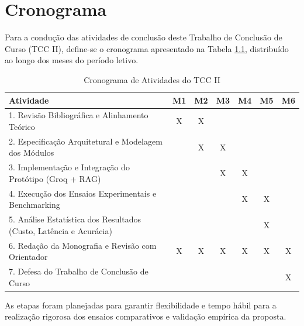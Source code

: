 \chapter{Cronograma}\label{cronograma}

Para a condução das atividades de conclusão deste Trabalho de Conclusão de Curso (TCC II), define-se o cronograma apresentado na Tabela \ref{tab:cronograma_tcc2}, distribuído ao longo dos meses do período letivo.

\begin{table}[!htb]
\centering
\caption{Cronograma de Atividades do TCC II}
\label{tab:cronograma_tcc2}
\begin{tabular}{|p{7.5cm}|c|c|c|c|c|c|}
\hline
\textbf{Atividade} & \textbf{M1} & \textbf{M2} & \textbf{M3} & \textbf{M4} & \textbf{M5} & \textbf{M6} \\ \hline
1. Revisão Bibliográfica e Alinhamento Teórico & X & X &  &  &  &  \\ \hline
2. Especificação Arquitetural e Modelagem dos Módulos &  & X & X &  &  &  \\ \hline
3. Implementação e Integração do Protótipo (Groq + RAG) &  &  & X & X &  &  \\ \hline
4. Execução dos Ensaios Experimentais e Benchmarking &  &  &  & X & X &  \\ \hline
5. Análise Estatística dos Resultados (Custo, Latência e Acurácia) &  &  &  &  & X &  \\ \hline
6. Redação da Monografia e Revisão com Orientador & X & X & X & X & X & X \\ \hline
7. Defesa do Trabalho de Conclusão de Curso &  &  &  &  &  & X \\ \hline
\end{tabular}
\end{table}

As etapas foram planejadas para garantir flexibilidade e tempo hábil para a realização rigorosa dos ensaios comparativos e validação empírica da proposta.
